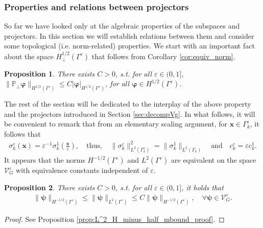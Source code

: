 \documentclass[]{article}
\newtheorem{proposition}{Proposition}
\numberwithin{equation}{section}
\numberwithin{theorem}{section}
\numberwithin{lemma}{section}
\numberwithin{corollary}{section}
\numberwithin{proposition}{section}
\numberwithin{definition}{section}
\newcommand{\bx}{\boldsymbol{x}}
\newcommand{\re}{\varepsilon}
\renewcommand{\vec}{\boldsymbol}
\begin{document}
	\subsubsection{Properties and relations between projectors}
	So far we have looked only at the algebraic properties of the subspaces and projectors. In this section we will establish relations between them and consider some topological (i.e. norm-related) properties. We start with an important fact about the space $H^{1/2}_{\perp}(\Gamma^{\re})$ that follows from Corollary \ref{cor:equiv_norm}.
	\begin{proposition}
		\label{prop:norm_equiv_perp}
		There exists $C>0$, s.t. for all $\re\in (0,1]$,  $\|\mathbb{P}_{\perp}\vec{\varphi}\|_{H^{1/2}(\Gamma^{\re})}\leq C |\vec{\varphi}|_{H^{1/2}(\Gamma^{\re})}$, for all $\vec{\varphi}\in H^{1/2}(\Gamma^{\re})$. 
	\end{proposition}
	The rest of the section will be dedicated to the interplay of the above property and the projectors introduced in Section \ref{sec:decompVg}. 
	In what follows, it will be convenient to remark that from an elementary scaling argument, for $\bx \in \Gamma^{\re}_k$, it follows that 
	\begin{align}
		\label{eq:sigmakeps}
		\sigma_k^{\re}(\vec{x})=\re^{-1}\sigma_k^1\left(\frac{\vec{x}}{\re}\right), \quad \text{thus},\quad \|\sigma_k^{\re}\|_{L^2(\Gamma_k^{\re})}^2=\|\sigma_k^1\|_{L^2(\Gamma_k)}\quad \text{and} \quad c^{\re}_k=\re c_k^1.
	\end{align}
	It appears that the norms $H^{-1/2}(\Gamma^{\re})$ and $L^2(\Gamma^{\re})$ are equivalent on the space $\mathcal{V}^{\re}_G$ with equivalence constants independent of $\re$.  
	\begin{proposition}
		\label{prop:L^2_H_minus_half_bound}
		There exists $C>0$, s.t. for all $\re \in (0, 1]$, it holds that
		\begin{align*}%
			\|\vec{\psi} \|_{H^{-1/2}(\Gamma^{\re})}\leq 	\|\vec{\psi}  \|_{L^2(\Gamma^{\re})} \leq C \|\vec{\psi} \|_{H^{-1/2}(\Gamma^{\re})}, \quad \forall \vec{\psi}\in \mathcal{V}_G^{\re}.
		\end{align*}
	\end{proposition}
	\begin{proof}
		See Proposition \ref{prop:L^2_H_minus_half_mbound_proof}.	
	\end{proof}
\end{document}
